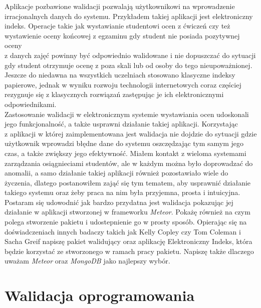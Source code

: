 \documentclass[brudnopis]{xmgr}
\begin{document}
\textcolor{wa}{Aplikacje pozbawione walidacji pozwalają użytkownikowi na wprowadzenie
irracjonalnych danych do systemu.} \textcolor{wb}{Przykładem takiej aplikacji jest elektroniczny indeks.
Operacje takie jak wystawianie studentowi ocen z ćwiczeń czy też wystawienie
oceny końcowej z egzaminu gdy student nie posiada pozytywnej oceny
\\
z danych zajęć powinny być odpowiednio
walidowane i nie dopuszczać do sytuacji gdy student otrzymuje ocenę z poza skali lub od osoby do tego nieupoważnionej.}
\textcolor{wb}{Jeszcze do niedawna na wszystkich uczelniach stosowano klasyczne indeksy papierowe,
jednak w wyniku rozwoju technologii internetowych coraz częściej rezygnuje się z klasycznych
rozwiązań zastępując je ich elektronicznymi odpowiednikami.}
\\

\textcolor{wc}{Zastosowanie walidacji w elektronicznym
systemie wystawiania ocen udoskonali jego funkcjonalność, a także usprawni działanie takiej aplikacji.
Korzystając 
\\
z aplikacji w której zaimplementowana jest walidacja nie dojdzie do sytuacji gdzie użytkownik wprowadzi błędne dane do systemu oszczędzając tym samym jego czas, a także zwiększy jego efektywność. 
Miałem kontakt z wieloma systemami zarządzania osiągnieciami studentów, ale w każdym można było doprowadzać
do anomalii, a samo działanie takiej aplikacji również pozostawiało wiele do życzenia, dlatego postanowiłem zająć się tym tematem,
aby usprawnić działanie takiego systemu oraz żeby praca na nim była przyjemna, prosta i intuicyjna. }
\\

\textcolor{wa}{Postaram się udowodnić jak bardzo przydatna jest walidacja pokazując jej działanie w aplikacji
stworzonej w frameworku \textit{Meteor}. Pokażę również na czym polega stworzenie pakietu i udostepnienie
go w prosty sposób.} \textcolor{wd}{Opierając się na doświadczeniach innych badaczy takich jak Kelly Copley \cite{Mesosphere}
czy Tom Coleman i Sacha Greif \cite{DiscoverMeteor2013} napiszę pakiet walidujący oraz aplikację Elektroniczny Indeks,
która będzie korzystać ze stworzonego w ramach pracy pakietu.} \textcolor{wa}{Napiszę także dlaczego uważam \textit{Meteor} oraz \textit{MongoDB} jako najlepszy wybór.}




\chapter{Walidacja oprogramowania}
\end{document}
